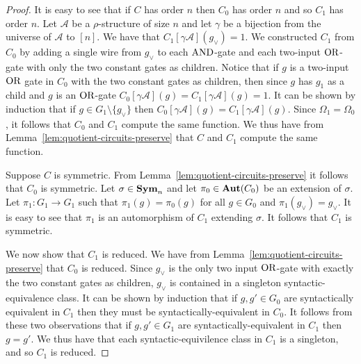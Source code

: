 \documentclass[../main/thesis.tex]{subfiles}
\begin{document}
\begin{proof}
  It is easy to see that if $C$ has order $n$ then $C_0$ has order $n$ and so
  $C_1$ has order $n$. Let $\mathcal{A}$ be a $\rho$-structure of size $n$ and
  let $\gamma$ be a bijection from the universe of $\mathcal{A}$ to $[n]$. We
  have that $C_1[\gamma \mathcal{A}](g_\lor) = 1$. We constructed $C_1$ from
  $C_0$ by adding a single wire from $g_\lor$ to each $\text{\upshape AND}$-gate and each
  two-input $\text{\upshape OR}$-gate with only the two constant gates as children. Notice that
  if $g$ is a two-input $\text{\upshape OR}$ gate in $C_0$ with the two constant gates as
  children, then since $g$ has $g_1$ as a child and $g$ is an $\text{\upshape OR}$-gate
  $C_0[\gamma \mathcal{A}](g) = C_1[\gamma \mathcal{A}](g) = 1$. It can be shown
  by induction that if $g \in G_1 \setminus \{g_\lor\}$ then $C_0 [\gamma
  \mathcal{A}](g) = C_1[\gamma \mathcal{A}](g)$. Since $\Omega_1 = \Omega_0$, it
  follows that $C_0$ and $C_1$ compute the same function. We thus have from
  Lemma~\ref{lem:quotient-circuits-preserve} that $C$ and $C_1$ compute the same
  function.

  Suppose $C$ is symmetric. From Lemma~\ref{lem:quotient-circuits-preserve} it
  follows that $C_0$ is symmetric. Let $\sigma \in \text{\textbf{Sym}}_n$ and let $\pi_0 \in
  \text{\textbf{Aut}}(C_0)$ be an extension of $\sigma$. Let $\pi_1 : G_1 \rightarrow G_1$ such
  that $\pi_1 (g) = \pi_0(g)$ for all $g \in G_0$ and $\pi_1 (g_\lor) = g_\lor$.
  It is easy to see that $\pi_1$ is an automorphism of $C_1$ extending $\sigma$.
  It follows that $C_1$ is symmetric.

  We now show that $C_1$ is reduced. We have from
  Lemma~\ref{lem:quotient-circuits-preserve} that $C_0$ is reduced. Since
  $g_\lor$ is the only two input $\text{\upshape OR}$-gate with exactly the two constant gates
  as children, $g_\lor$ is contained in a singleton syntactic-equivalence class.
  It can be shown by induction that if $g, g' \in G_0$ are syntactically
  equivalent in $C_1$ then they must be syntactically-equivalent in $C_0$. It
  follows from these two observations that if $g, g' \in G_1$ are
  syntactically-equivalent in $C_1$ then $g = g'$. We thus have that each
  syntactic-equivilence class in $C_1$ is a singleton, and so $C_1$ is reduced.


\end{proof}
\end{document}
